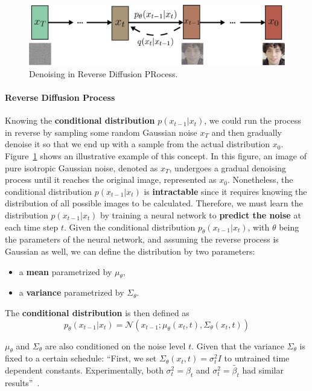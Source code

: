 \documentclass[sn-mathphys,Numbered]{sn-jnl}
\theoremstyle{thmstyleone}%
\theoremstyle{thmstyletwo}%
\theoremstyle{thmstylethree}%
\begin{document}
\begin{figure}[b]
	\centering
	\includegraphics[scale=0.74, keepaspectratio]{img/background_img/Diffusion2.png}
	\caption{Denoising in Reverse Diffusion PRocess.}\label{fig:m-chain}
\end{figure}


\paragraph{Reverse Diffusion Process} Knowing the \textbf{conditional distribution} $p(x_{t-1}|x_t)$, we could run the process in reverse by sampling some random Gaussian noise $x_T$ and then gradually denoise it so that we end up with a sample from the actual distribution $x_0$.
Figure~\ref{fig:m-chain} shows an illustrative example of this concept. In this figure, an image of pure isotropic Gaussian noise, denoted as $x_T$, undergoes a gradual denoising process until it reaches the original image, represented as $x_0$.
Nonetheless, the conditional distribution $p(x_{t-1}|x_t)$ is \textbf{intractable} since it requires knowing the distribution of all possible images to be calculated.
Therefore, we must learn the distribution $p(x_{t-1}|x_t)$ by training a neural network to \textbf{predict the noise} at each time step $t$. Given the conditional distribution $p_\theta(x_{t-1}|x_t)$, 
with $\theta$ being the parameters of the neural network, and assuming the reverse process is Gaussian as well, we can define the distribution by two parameters:

\begin{itemize}
	\item a \textbf{mean} parametrized by $\mu_\theta$,
	\item a \textbf{variance} parametrized by $\Sigma_\theta$.
\end{itemize}

The \textbf{conditional distribution} is then defined as
\begin{equation}
	p_\theta(x_{t-1}|x_t) = \mathcal{N}(x_{t-1}; \mu_\theta(x_t,t), \Sigma_\theta(x_t,t))
\end{equation}

$\mu_\theta$ and $\Sigma_\theta$ are also conditioned on the noise level $t$.
Given that the variance $\Sigma_\theta$ is fixed to a certain schedule: ``First, we set $\Sigma_\theta(x_t,t)=\sigma_t^2I$ to untrained time dependent constants. Experimentally, both $\sigma_t^2=\beta_t$ and $\sigma_t^2=\tilde{\beta_t}$ had similar results''~\cite{ho2020denoising}.
\end{document}
